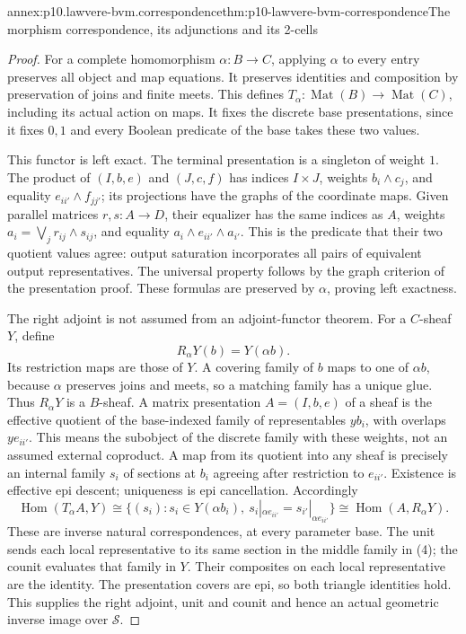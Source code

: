 \begin{annexitem}{annex:p10.lawvere-bvm.correspondence}{thm:p10-lawvere-bvm-correspondence}{The morphism correspondence, its adjunctions and its 2-cells}
\begin{proof}
For a complete homomorphism \(\alpha:B\to C\), applying
\(\alpha\) to every entry preserves all object and map equations.
It preserves identities and composition by preservation of joins and
finite meets. This defines \(T_\alpha:\operatorname{Mat}(B)\to
\operatorname{Mat}(C)\), including its actual action on maps.
It fixes the discrete base presentations, since it fixes \(0,1\)
and every Boolean predicate of the base takes these two values.

This functor is left exact. The terminal presentation is a singleton
of weight \(1\). The product of \((I,b,e)\) and \((J,c,f)\)
has indices \(I\times J\), weights \(b_i\wedge c_j\), and
equality \(e_{ii'}\wedge f_{jj'}\); its projections have the
graphs of the coordinate maps. Given parallel matrices \(r,s:A\to D\),
their equalizer has the same indices as \(A\), weights
\(a_i=\bigvee_j r_{ij}\wedge s_{ij}\), and equality
\(a_i\wedge e_{ii'}\wedge a_{i'}\). This is the predicate
that their two quotient values agree: output saturation incorporates
all pairs of equivalent output representatives. The universal property
follows by the graph criterion of the presentation proof. These formulas
are preserved by \(\alpha\), proving left exactness.

The right adjoint is not assumed from an adjoint-functor theorem.
For a \(C\)-sheaf \(Y\), define
\[
             R_\alpha Y(b)=Y(\alpha b).
\]
Its restriction maps are those of \(Y\). A covering family of
\(b\) maps to one of \(\alpha b\), because \(\alpha\)
preserves joins and meets, so a matching family has a unique glue.
Thus \(R_\alpha Y\) is a \(B\)-sheaf. A matrix presentation
\(A=(I,b,e)\) of a sheaf is the effective quotient of the
base-indexed family of representables \(y b_i\), with overlaps
\(y e_{ii'}\). This means the subobject of the discrete family
with these weights, not an assumed external coproduct. A map from
its quotient into any sheaf is precisely an internal family
\(s_i\) of sections at \(b_i\) agreeing after restriction to
\(e_{ii'}\). Existence is effective epi descent; uniqueness is
epi cancellation. Accordingly
\[
 \operatorname{Hom}(T_\alpha A,Y)
 \cong\{(s_i):s_i\in Y(\alpha b_i),\ s_i|_{\alpha e_{ii'}}
                           =s_{i'}|_{\alpha e_{ii'}}\}
 \cong\operatorname{Hom}(A,R_\alpha Y).                 \tag{4}
\]
These are inverse natural correspondences, at every parameter base.
The unit sends each local representative to its same section in the
middle family in (4); the counit evaluates that family in \(Y\).
Their composites on each local representative are the identity.
The presentation covers are epi, so both triangle identities hold.
This supplies the right adjoint, unit and counit and hence an actual
geometric inverse image over \(\mathcal S\).


\end{proof}
\end{annexitem}
